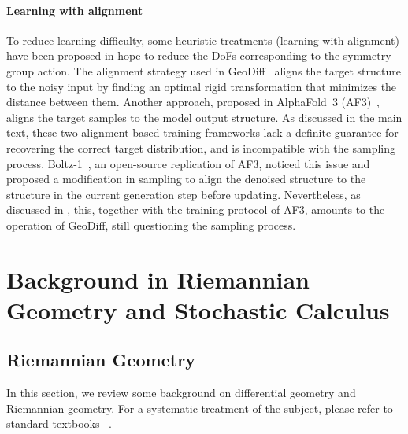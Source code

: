 \paragraph{Learning with alignment}
To reduce learning difficulty, some heuristic treatments (learning with alignment) have been proposed in hope to reduce the DoFs corresponding to the symmetry group action. The alignment strategy used in GeoDiff~\citep{xu2022geodiff} aligns the target structure to the noisy input by finding an optimal rigid transformation that minimizes the distance between them. Another approach, proposed in AlphaFold~3 (AF3)~\citep{abramson2024accurate}, aligns the target samples to the model output structure. As discussed in the main text, these two alignment-based training frameworks lack a definite guarantee for recovering the correct target distribution, and is incompatible with the sampling process. Boltz-1~\citep{wohlwend2025boltz}, an open-source replication of AF3, noticed this issue and proposed a modification in sampling to align the denoised structure to the structure in the current generation step before updating. Nevertheless, as discussed in , this, together with the training protocol of AF3, amounts to the operation of GeoDiff, still questioning the sampling process.

\section{Background in Riemannian Geometry and Stochastic Calculus} \label{appx:background}
\subsection{Riemannian Geometry}\label{appx:rg}
In this section, we review some background on differential geometry and Riemannian geometry. For a systematic treatment of the subject, please refer to standard textbooks ~\citet{lee2003smooth,lee2018introduction}. 

